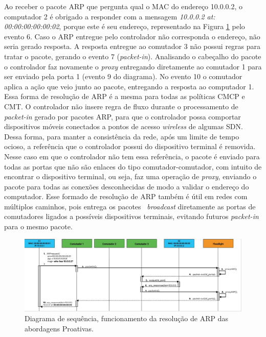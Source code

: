 Ao receber o pacote ARP que pergunta qual o MAC do endereço 10.0.0.2, o computador 2 é obrigado a responder com a mensagem \emph{10.0.0.2 at: 00:00:00:00:00:02}, porque este é seu endereço, representado na Figura \ref{fig:proxyArp} pelo evento 6. Caso o ARP entregue pelo controlador não corresponda o endereço, não seria gerado resposta. A resposta entregue ao comutador 3 não possui regras para tratar o pacote, gerando o evento 7 (\emph{packet-in}). Analisando o cabeçalho do pacote o controlador faz novamente o \emph{proxy} entregando diretamente ao comutador 1 para ser enviado pela porta 1 (evento 9 do diagrama). No evento 10 o comutador aplica a ação que veio junto ao pacote, entregando a resposta ao computador 1. Essa forma de resolução de ARP é a mesma para todas as políticas CMCP e CMT. O controlador não insere regra de fluxo durante o processamento de \textit{packet-in} gerado por pacotes ARP, para que o controlador possa comportar dispositivos móveis conectados a pontos de acesso \textit{wireless} de algumas SDN. Dessa forma, para manter a consistência da rede, após um limite de tempo ocioso, a referência que o controlador possui do dispositivo terminal é removida. Nesse caso em que o controlador não tem essa referência, o pacote é enviado para todas as portas que não são enlaces do tipo comutador-comutador, com intuito de encontrar o dispositivo terminal, ou seja, faz uma operação de \emph{proxy}, enviando o pacote para todas as conexões desconhecidas de modo a validar o endereço do computador. Esse formado de resolução de ARP também é útil em redes com múltiplos caminhos, pois entrega os pacotes ~\emph{broadcast} diretamente as portas de comutadores ligados a possíveis dispositivos terminais, evitando futuros \textit{packet-in} para o mesmo pacote. 


\begin{figure}[htb!]
	\caption{\label{fig:proxyArp}Diagrama de sequência, funcionamento da resolução de ARP das abordagens Proativas.} 
	\begin{center}
	    \includegraphics[scale=0.45]{imagens/arpProxy.jpg}
	\end{center}
\end{figure}

